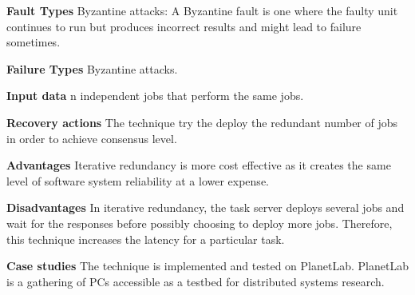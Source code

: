 \begin{compactitem}
\item[\textbf{Fault Types}]Byzantine attacks: A Byzantine fault is one where the faulty unit continues to run but produces incorrect results and might lead to failure sometimes. 

\item[\textbf{Failure Types}]Byzantine attacks.

\item[\textbf{Input data}] n independent jobs that perform the same jobs.

\item[\textbf{Recovery actions}]The technique try the deploy the redundant number of jobs in order to achieve consensus level.

\item[\textbf{Advantages}] Iterative redundancy is more cost effective as it creates the same level of software system reliability at a lower expense.

\item[\textbf{Disadvantages}] In iterative redundancy, the task server deploys several jobs and wait for the responses before possibly choosing to deploy more jobs. Therefore, this technique increases the latency for a particular task.

\item[\textbf{Case studies}]
The technique is implemented and tested on PlanetLab. PlanetLab is a gathering of PCs accessible as a testbed for distributed systems research.\\
\end{compactitem}


